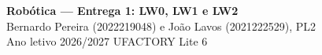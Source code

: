 \documentclass[10pt,a4paper]{article}
\begin{document}
\begin{center}
{\Large\bfseries Robótica — Entrega 1: LW0, LW1 e LW2}\\[2mm]
Bernardo Pereira (2022219048) e João Lavos (2021222529), PL2\\
Ano letivo 2026/2027 \quad UFACTORY Lite 6
\end{center}
\vspace{-3mm}
\tableofcontents
\vspace{1mm}




\end{document}
